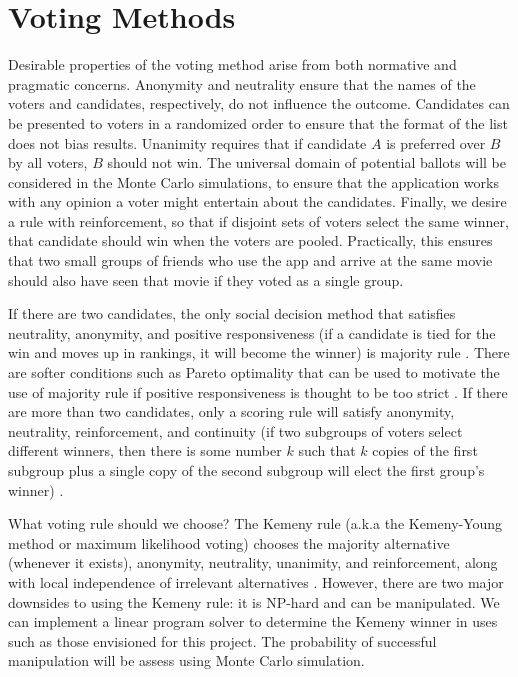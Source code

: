\documentclass{article}
\begin{document}
\section{Voting Methods}


Desirable properties of the voting method arise from both normative and pragmatic concerns. Anonymity and neutrality ensure that the names of the voters and candidates, respectively, do not influence the outcome. Candidates can be presented to voters in a randomized order to ensure that the format of the list does not bias results. Unanimity requires that if candidate $A$ is preferred over $B$ by all voters, $B$ should not win. The universal domain of potential ballots will be considered in the Monte Carlo simulations, to ensure that the application works with any opinion a voter might entertain about the candidates. Finally, we desire a rule with reinforcement, so that if disjoint sets of voters select the same winner, that candidate should win when the voters are pooled. Practically, this ensures that two small groups of friends who use the app and arrive at the same movie should also have seen that movie if they voted as a single group.

If there are two candidates, the only social decision method that satisfies neutrality, anonymity, and positive responsiveness (if a candidate is tied for the win and moves up in rankings, it will become the winner) is majority rule \citep{may1952}. There are softer conditions such as Pareto optimality that can be used to motivate the use of majority rule if positive responsiveness is thought to be too strict \citep{acsan2002,j2003majority}. If there are more than two candidates, only a scoring rule will satisfy anonymity, neutrality, reinforcement, and continuity (if two subgroups of voters select different winners, then there is some number $k$ such that $k$ copies of the first subgroup plus a single copy of the second subgroup will elect the first group's winner) \citep{young1975}. 

What voting rule should we choose? The Kemeny rule (a.k.a the Kemeny-Young method or maximum likelihood voting) chooses the majority alternative (whenever it exists), anonymity, neutrality, unanimity, and reinforcement, along with local independence of irrelevant alternatives \citep{kemeny1959,young1978,young1995}. However, there are two major downsides to using the Kemeny rule: it is NP-hard \citep{conitzer2006improved,davenport2004} and can be manipulated. We can implement a linear program solver to determine the Kemeny winner in uses such as those envisioned for this project. The probability of successful manipulation will be assess using Monte Carlo simulation.
\end{document}
